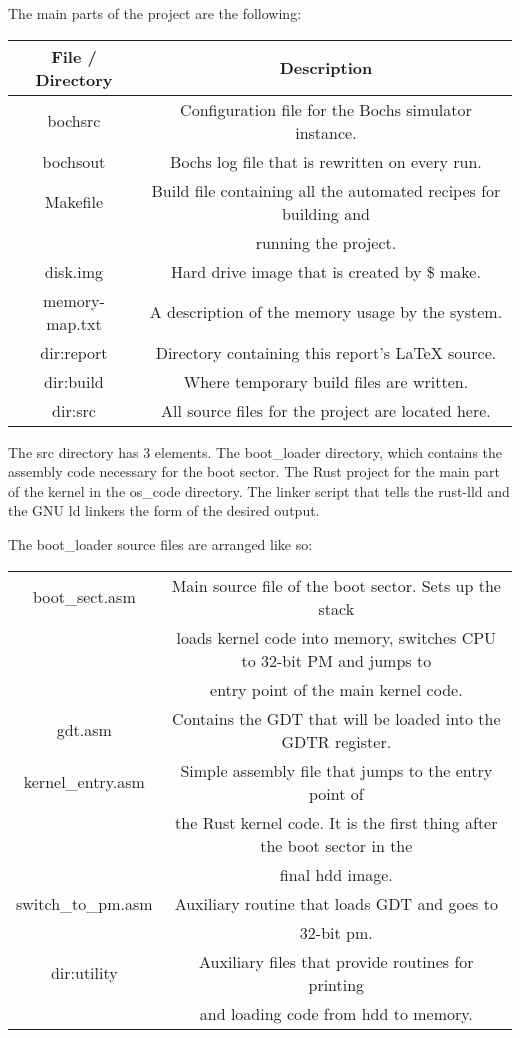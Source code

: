 \documentclass[12pt]{article}
\begin{document}
The main parts of the project are the following:
\begin{center}
	\begin{tabular}{|c|c|}
		\hline
		File / Directory & Description \\
		\hline
		bochsrc & Configuration file for the Bochs simulator instance. \\
		\hline
		bochsout & Bochs log file that is rewritten on every run. \\
		\hline
		Makefile & Build file containing all the automated recipes for building and \\
		& running the project. \\
		\hline
		disk.img & Hard drive image that is created by \$ make. \\
		\hline
		memory-map.txt & A description of the memory usage by the system. \\
		\hline
		dir:report & Directory containing this report's LaTeX source. \\
		\hline
		dir:build & Where temporary build files are written. \\
		\hline
		dir:src & All source files for the project are located here. \\
		\hline
	\end{tabular}
\end{center}

The src directory has 3 elements. The boot\_loader directory, which contains
the assembly code necessary for the boot sector. The Rust project for the main part of the kernel in the os\_code directory. The linker script that tells
the rust-lld and the GNU ld linkers the form of the desired output. \\

\pagebreak

The boot\_loader source files are arranged like so:

\begin{center}
	\begin{tabular}{|c|c|}
		\hline
		boot\_sect.asm & Main source file of the boot sector. Sets up the stack \\
		& loads kernel code into memory, switches CPU to 32-bit PM and jumps to \\
		& entry point of the main kernel code. \\
		\hline
		gdt.asm & Contains the GDT that will be loaded into the GDTR register. \\
		\hline
		kernel\_entry.asm & Simple assembly file that jumps to the entry point of \\
		& the Rust kernel code. It is the first thing after the boot sector in the \\
		& final hdd image. \\
		\hline
		switch\_to\_pm.asm & Auxiliary routine that loads GDT and goes to \\
		& 32-bit pm. \\
		\hline 
		dir:utility & Auxiliary files that provide routines for printing \\
		& and loading code from hdd to memory. \\
		\hline
	\end{tabular}
\end{center}
\end{document}
